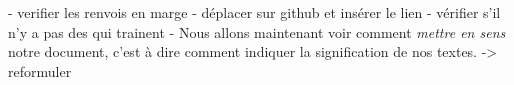 - verifier les renvois en marge
- déplacer sur github et insérer le lien
- vérifier s'il n'y a pas des  qui trainent
- Nous allons maintenant voir comment \emph{mettre en sens} notre document, c'est à dire comment indiquer  la signification de nos textes. -> reformuler